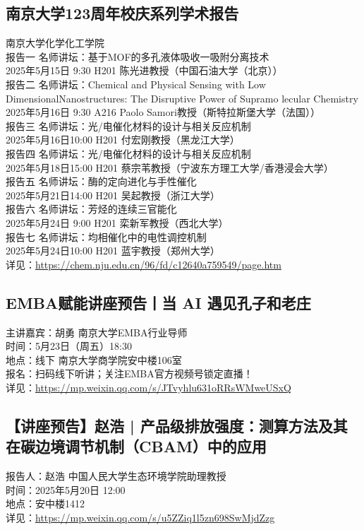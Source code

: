 \documentclass[letterpaper, 12pt]{article}
\begin{document}
\begin{multicols}{2}
\subsection{南京大学123周年校庆系列学术报告} %
南京大学化学化工学院
\\报告一 名师讲坛：基于MOF的多孔液体吸收一吸附分离技术
\\2025年5月15日 9:30 H201 陈光进教授（中国石油大学（北京））
\\报告二 名师讲坛：Chemical and Physical Sensing with Low DimensionalNanostructures: The Disruptive Power of Supramo lecular Chemistry
\\2025年5月16日 9:30 A216 Paolo Samori教授（斯特拉斯堡大学（法国））
\\报告三 名师讲坛：光/电催化材料的设计与相关反应机制
\\2025年5月16日10:00 H201 付宏刚教授（黑龙江大学）
\\报告四 名师讲坛：光/电催化材料的设计与相关反应机制
\\2025年5月18日15:00 H201 蔡宗苇教授（宁波东方理工大学/香港浸会大学）
\\报告五 名师讲坛：酶的定向进化与手性催化
\\2025年5月21日14:00 H201 吴起教授（浙江大学）
\\报告六 名师讲坛：芳烃的连续三官能化
\\2025年5月24日 9:00 H201 栾新军教授（西北大学） 
\\报告七 名师讲坛：均相催化中的电性调控机制
\\2025年5月24日10:00 H201 蓝宇教授（郑州大学）
\\详见：\url{https://chem.nju.edu.cn/96/fd/c12640a759549/page.htm}

\subsection{EMBA赋能讲座预告丨当 AI 遇见孔子和老庄} %
主讲嘉宾：胡勇 南京大学EMBA行业导师
\\时间：5月23日（周五）18:30
\\地点：线下 南京大学商学院安中楼106室
\\报名：扫码线下听讲；关注EMBA官方视频号锁定直播！
\\详见：\url{https://mp.weixin.qq.com/s/JTvyhlu631oRRsWMweUSxQ}

\subsection{【讲座预告】赵浩 | 产品级排放强度：测算方法及其在碳边境调节机制（CBAM）中的应用} %
报告人：赵浩 中国人民大学生态环境学院助理教授
\\时间：2025年5月20日 12:00
\\地点：安中楼1412 
\\详见：\url{https://mp.weixin.qq.com/s/u5ZZiq1l5zn698SwMjdZzg}

\end{multicols}
\end{document}
